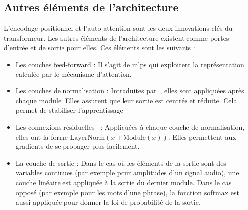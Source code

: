 \subsection{Autres éléments de l'architecture}

L'encodage positionnel et l'auto-attention sont les deux innovations clés du transformeur.
Les autres éléments de l'architecture existent comme portes d'entrée et de sortie pour elles.
Ces éléments sont les suivants :
\begin{itemize}
    \item Les couches \foreignlanguage{english}{feed-forward} :
          Il s'agit de \glspl{mlp} qui exploitent la représentation calculée par le mécanisme d'attention.
    \item Les couches de normalisation :
          Introduites par~\cite{Ba_Kiros_Hinton_2016}, elles sont appliquées après chaque module.
          Elles assurent que leur sortie est centrée et réduite.
          Cela permet de stabiliser l'apprentissage.
    \item Les connexions résiduelles~\cite{He_Zhang_Ren_Sun_2016} :
          Appliquées à chaque couche de normalisation, elles ont la forme 
          \(\mathrm{LayerNorm}\left(x + \mathrm{Module}(x)\right)\).
          Elles permettent aux gradients de se propager plus facilement.
    \item La couche de sortie :
          Dans le cas où les éléments de la sortie sont des variables continues 
          (par exemple pour amplitudes d'un signal audio),
          une couche linéaire est appliquée à la sortie du dernier module.
          Dans le cas opposé (par exemple pour les mots d'une phrase),
          la fonction \(\mathrm{softmax}\) est aussi appliquée pour donner la loi de probabilité de la sortie.
\end{itemize}